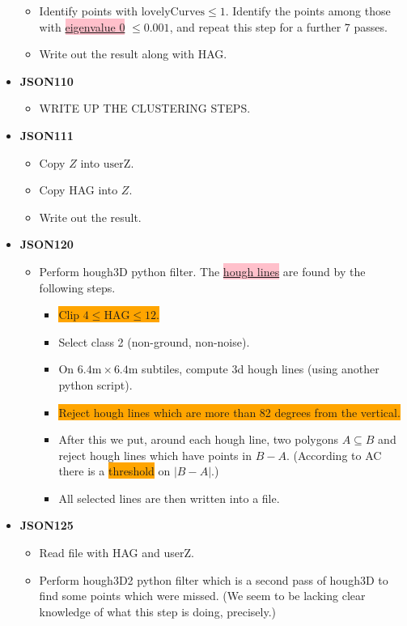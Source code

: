\documentclass[a4paper,11pt,twoside]{article}
\theoremstyle{definition}
\theoremstyle{remark}
\newcommand{\sh}[1]{\colorbox{pink}{#1}}
\newcommand{\bad}[1]{\colorbox{orange}{#1}}
\begin{document}
\begin{itemize}
\begin{itemize}
\item Identify points with $\mathrm{lovelyCurves}\leqslant 1$. Identify the points among those with \hyperref[evalz]
{\sh{eigenvalue 0}} $\leqslant 0.001$, and repeat this step for a further 7 passes.
\item Write out the result along with HAG.
\end{itemize}
\item \textbf{JSON110}
\begin{itemize}
\item WRITE UP THE CLUSTERING STEPS.
\end{itemize}
\item \textbf{JSON111}
\begin{itemize}
\item Copy $Z$ into $\mathrm{userZ}$.
\item Copy HAG into $Z$.
\item Write out the result.
\end{itemize}
\item \textbf{JSON120}
\begin{itemize}
\item Perform hough3D python filter. The \hyperref[hough]{\sh{hough lines}} are found by the following steps.
\begin{itemize}
\item \bad{Clip $4\leqslant\mathrm{HAG}\leqslant 12$.}
\item Select class 2 (non-ground, non-noise).
\item On $6.4\mathrm{m}\times 6.4\mathrm{m}$ subtiles, compute 3d hough lines (using another python script).
\item \bad{Reject hough lines which are more than 82 degrees from the vertical.}
\item After this we put, around each hough line, two polygons $A\subseteq B$ and reject hough lines which have points in $B-A$. (According to AC there is a \bad{threshold} on $|B-A|$.)
\item All selected lines are then written into a file.
\end{itemize}
\end{itemize}
\item \textbf{JSON125}
\begin{itemize}
\item Read file with HAG and userZ.
\item Perform hough3D2 python filter which is a second pass of hough3D to find some points which were missed. (We seem to be lacking clear knowledge of what this step is doing, precisely.)

\end{itemize}
\end{itemize}
\end{document}
